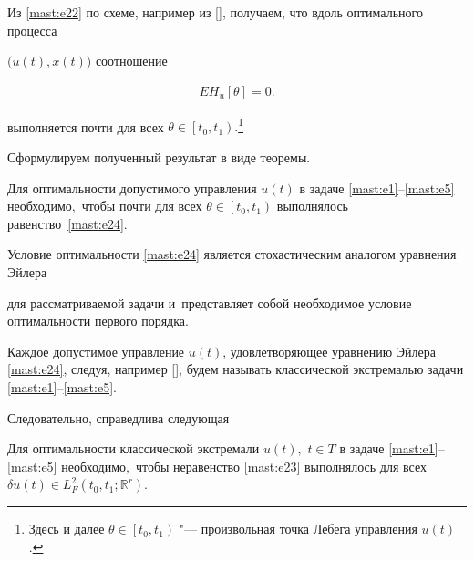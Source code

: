 Из \eqref{mast:e22}  по схеме, например из [], получаем, что вдоль оптимального процесса  

$ \bigl( u(t), x(t) \bigr)  $   соотношение

\begin{gather} 

  \label{mast:e24}

E H_{u}[\theta ]=0.

 \end{gather}

 выполняется  почти для всех $ \theta\in \left[ t_{0}, t_{1} \right) .$\footnote{Здесь и далее $ \theta\in \left[ t_{0}, t_{1} \right) $ "---  произвольная точка Лебега управления $ u(t) $.} 



   

  

Сформулируем полученный результат в виде теоремы.

\smallskip

\begin{theorem}[1]Для оптимальности допустимого управления $ u(t) $ в задаче \eqref{mast:e1}--\eqref{mast:e5} необходимо$,$ чтобы  почти  для всех $ \theta\in \left[ t_{0}, t_{1} \right)  $  выполнялось равенство~\rm \eqref{mast:e24}.

\end{theorem}



\smallskip





Условие оптимальности \eqref{mast:e24}  является стохастическим аналогом уравнения Эйлера 

для рассматриваемой задачи и~представляет собой необходимое условие оптимальности первого порядка. 



Каждое  допустимое управление  $ u(t) $, удовлетворяющее уравнению Эйлера \eqref{mast:e24}, следуя, например [], будем  называть классической экстремалью   задачи \eqref{mast:e1}--\eqref{mast:e5}.



Следовательно, справедлива следующая 

\smallskip

\begin{theorem}[2]Для оптимальности классической экстремали $ u(t) ,$ $ t\in T $  в задаче \eqref{mast:e1}--\eqref{mast:e5} необходимо$,$ чтобы неравенство \eqref{mast:e23} выполнялось  для всех $ \delta u(t)\in L^{2}_{F}(t_{0}, t_{1}; \mathbb R^{r}) .$ 

\end{theorem}



